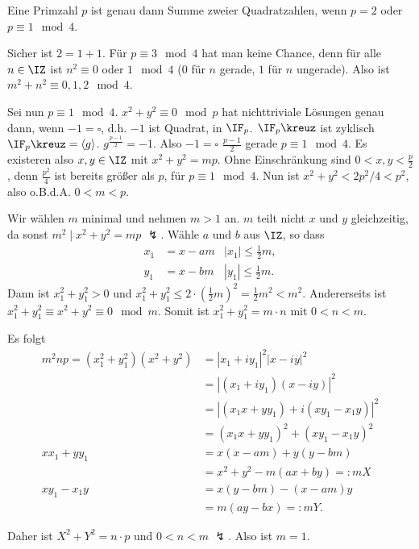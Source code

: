 \begin{Fakt}[FERMAT]
Eine Primzahl $p$ ist genau dann Summe zweier Quadratzahlen, wenn $p=2$ oder $p\equiv 1 \mod{4}$.
\end{Fakt}

\begin{Beweis}
 Sicher ist $2=1+1$. Für $p\equiv 3 \mod{4}$ hat man keine Chance, denn für alle $n\in\IZ$ ist $n^2\equiv 0$ oder $1 \mod{4}$ ($0$ für $n$ gerade, $1$ für $n$ ungerade). Also ist $m^2+n^2 \equiv 0,1,2 \mod{4}$.
 
Sei nun $p\equiv 1\mod{4}$. $x^2+y^2\equiv 0 \mod{p}$ hat nichttriviale Lösungen genau dann, wenn $-1 =\square$, d.h. $-1$ ist Quadrat, in $\IF_p$. $\IF_p\kreuz$ ist zyklisch \folge $\IF_p\kreuz=\langle g \rangle$. $g^{\frac{p-1}{2}}=-1$. Also $-1=\square$ \gdw $\frac{p-1}{2}$ gerade \gdw $p\equiv 1 \mod{4}$.
Es existeren also $x,y\in\IZ$ mit $x^2+y^2=mp$. Ohne Einschränkung sind $0<x,y<\frac{p}{2}$, denn $\frac{p^2}{4}$ ist bereits größer als $p$, für $p\equiv 1\mod{4}$. Nun ist $x^2+y^2 < 2 p^2/4<p^2$, also o.B.d.A. $0<m<p$.

Wir wählen $m$ minimal und nehmen $m>1$ an. $m$ teilt nicht $x$ und $y$ gleichzeitig, da sonst $m^2 \mid x^2+y^2=mp$ $\lightning$.
Wähle $a$ und $b$ aus $\IZ$, so dass \begin{align*}
x_1&= x-am & |x_1|\leq \frac{1}{2}m,\\
y_1&= x-bm & |y_1|\leq \frac{1}{2}m.
                                     \end{align*}
Dann ist $x_1^2+y_1^2>0$ und $x_1^2+y_1^2\leq 2\cdot\left(\frac{1}{2}m\right)^2=\frac{1}{2}m^2<m^2$.
Andererseits ist $x_1^2+y_1^2\equiv x^2+y^2\equiv 0 \mod{m}$. Somit ist $x_1^2+y_1^2=m\cdot n$ mit $0<n<m$.

Es folgt 
\begin{align*}
 m^2np=(x_1^2+y_1^2)(x^2+y^2)&=|x_1+iy_1|^2|x-iy|^2 \\
 &=|(x_1+iy_1)(x-iy)|^2 \\
 &=|(x_1x+yy_1)+i(xy_1-x_1y)|^2 \\
 &=(x_1x+yy_1)^2+(xy_1-x_1y)^2 \\
 xx_1+yy_1&=x(x-am)+y(y-bm)\\
 &= x^2+y^2-m(ax+by)=:mX\\
 xy_1-x_1y&=x(y-bm)-(x-am)y\\
 &=m(ay-bx)=:mY.
\end{align*}

Daher ist $X^2+Y^2=n\cdot p$ und $0<n<m$ $\lightning$. Also ist $m=1$.
\end{Beweis}

